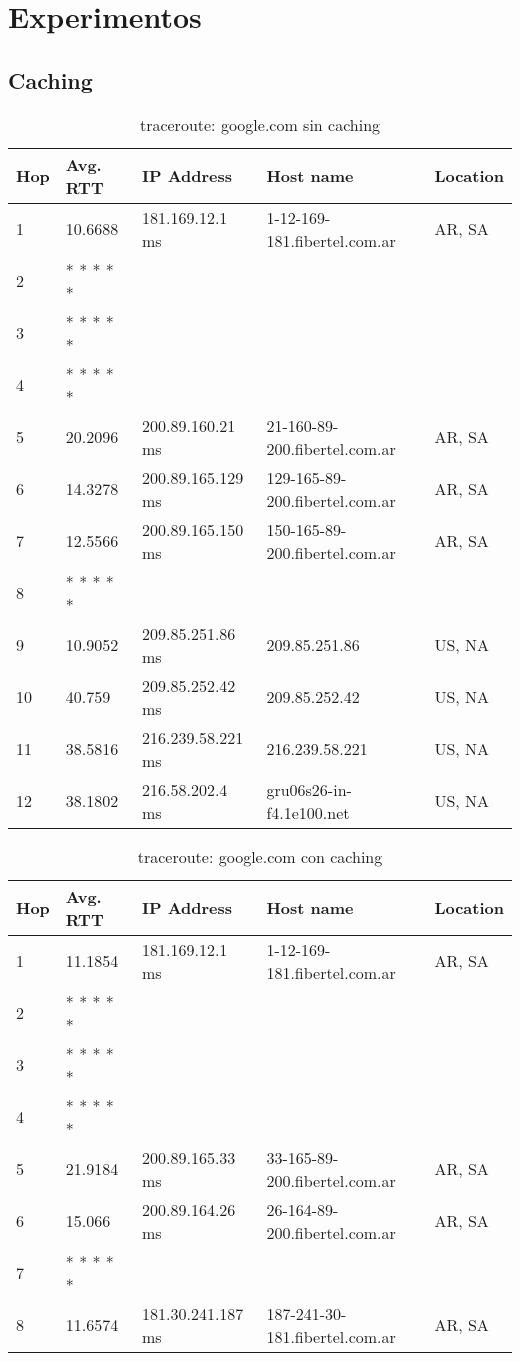 \section{Experimentos}

\subsection{Caching}

\begin{table}[H]
\centering
\begin{tabular}{@{}lllll@{}}
\toprule
Hop & Avg. RTT & IP Address & Host name & Location\\ \midrule
1 & 10.6688 & 181.169.12.1 ms & 1-12-169-181.fibertel.com.ar & AR, SA\\
2 &  * * * * * &  &  &  \\
3 &  * * * * * &  &  &  \\
4 &  * * * * * &  &  &  \\
5 & 20.2096 & 200.89.160.21 ms & 21-160-89-200.fibertel.com.ar & AR, SA\\
6 & 14.3278 & 200.89.165.129 ms & 129-165-89-200.fibertel.com.ar & AR, SA\\
7 & 12.5566 & 200.89.165.150 ms & 150-165-89-200.fibertel.com.ar & AR, SA\\
8 &  * * * * * &  &  &  \\
9 & 10.9052 & 209.85.251.86 ms & 209.85.251.86 & US, NA\\
10 & 40.759 & 209.85.252.42 ms & 209.85.252.42 & US, NA\\
11 & 38.5816 & 216.239.58.221 ms & 216.239.58.221 & US, NA\\
12 & 38.1802 & 216.58.202.4 ms & gru06s26-in-f4.1e100.net & US, NA\\ \bottomrule
\end{tabular}
\caption{traceroute: google.com sin caching}
\label{google}
\end{table}


\begin{table}[H]
\centering
\begin{tabular}{@{}lllll@{}}
\toprule
Hop & Avg. RTT & IP Address & Host name & Location\\ \midrule
1 & 11.1854 & 181.169.12.1 ms & 1-12-169-181.fibertel.com.ar & AR, SA\\
2 &  * * * * * &  &  &  \\
3 &  * * * * * &  &  &  \\
4 &  * * * * * &  &  &  \\
5 & 21.9184 & 200.89.165.33 ms & 33-165-89-200.fibertel.com.ar & AR, SA\\
6 & 15.066 & 200.89.164.26 ms & 26-164-89-200.fibertel.com.ar & AR, SA\\
7 &  * * * * * &  &  &  \\
8 & 11.6574 & 181.30.241.187 ms & 187-241-30-181.fibertel.com.ar & AR, SA\\ \bottomrule
\end{tabular}
\caption{traceroute: google.com con caching}
\label{googlecache}
\end{table}

